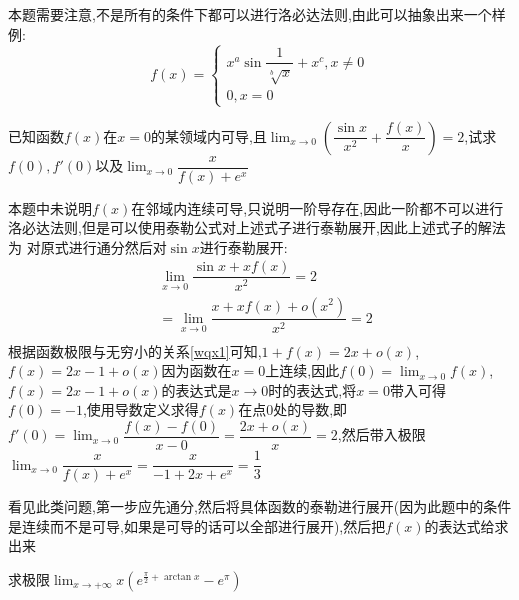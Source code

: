 \documentclass[10pt, a4paper, oneside, UTF8]{ctexbook}
\begin{document}
\begin{sloppypar}
\begin{solution}
    \end{solution}
    \begin{note}
        本题需要注意,不是所有的条件下都可以进行洛必达法则,由此可以抽象出来一个样例:
        $$f\left(x\right)=\begin{cases}x^a\sin\dfrac{1}{\sqrt[b]{x}}+x^c,x\neq0\\0,x=0\end{cases}$$
    \end{note}
    \begin{problem}
        已知函数$f(x)$在$x=0$的某领域内可导,且$\lim_{x \to 0}(\dfrac{\sin x}{x^2}+\dfrac{f(x)}{x})=2$,试求$f(0),f'(0)$以及$\lim_{x\to0}\dfrac{x}{f(x)+e^x}$
    \end{problem}
    \begin{solution}
        本题中未说明$f(x)$在邻域内连续可导,只说明一阶导存在,因此一阶都不可以进行洛必达法则,但是可以使用泰勒公式对上述式子进行泰勒展开,因此上述式子的解法为
        对原式进行通分然后对$\sin x$进行泰勒展开:
        \begin{equation*}
            \begin{split}    
                & \lim_{x \to 0}\dfrac{\sin x+xf(x)}{x^2}=2\\
                & = \lim_{x \to 0}\dfrac{x+xf(x)+o(x^2)}{x^2}=2 \\
            \end{split}
        \end{equation*} 
    根据函数极限与无穷小的关系\ref{wqx1}可知,$1+f(x)=2x+o(x)$,$f(x)=2x-1+o(x)$因为函数在$x=0$上连续,因此$f(0)=\lim_{x\to 0}f(x)$,$f(x)=2x-1+o(x)$的表达式是$x\to 0$时的表达式,将$x=0$带入可得$f(0)=-1$,使用导数定义求得$f(x)$在点0处的导数,即$f'(0)=\lim_{x \to 0}\dfrac{f(x)-f(0)}{x-0}=\dfrac{2x+o(x)}{x}=2$,然后带入极限$\lim_{x\to 0}\dfrac{x}{f(x)+e^x}=\dfrac{x}{-1+2x+e^x}=\dfrac{1}{3}$
    \end{solution}
    \begin{note}
        看见此类问题,第一步应先通分,然后将具体函数的泰勒进行展开(因为此题中的条件是连续而不是可导,如果是可导的话可以全部进行展开),然后把$f(x)$的表达式给求出来
    \end{note}
    \begin{problem}
        求极限$\lim_{x\to +\infty}x(e^{\frac{\pi}{2}+\arctan x}-e^\pi)$
    \end{problem}
    \begin{solution}

\end{solution}
\end{sloppypar}
\end{document}
